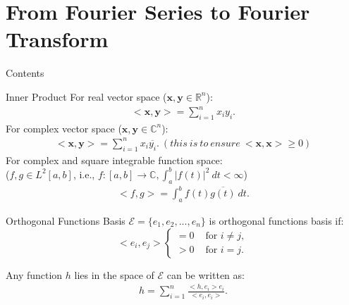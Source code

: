 \documentclass{beamer}
\begin{document}
	\section[Fourier Analysis]{From Fourier Series to Fourier Transform}
		\begin{frame}{Contents}
			\small
		\end{frame}
	\begin{frame}{Inner Product}
		For real vector space ($\boldsymbol{x}, \boldsymbol{y} \in \mathbb{R}^n$):
		\begin{align*}
			<\boldsymbol{x}, \boldsymbol{y}> = \sum_{i=1}^{n}x_iy_i.
		\end{align*}
		For complex vector space ($\boldsymbol{x}, \boldsymbol{y} \in \mathbb{C}^n$):
		\begin{align*}
			<\boldsymbol{x}, \boldsymbol{y}> = \sum_{i=1}^{n}x_i\overline{y_i}.\ (this\ is\ to\ ensure\ <\boldsymbol{x}, \boldsymbol{x}>\geq 0)
		\end{align*}
		For complex and square integrable function space: \\($f,g \in L^2[a,b]$, i.e., $f: [a,b] \rightarrow \mathbb{C}, \int_{a}^{b} | f(t) |^2 \ dt < \infty$)
		\begin{align*}
			<f,g> = \int_{a}^{b} f(t) \overline{g(t)}\ dt.
		\end{align*}
	\end{frame}
	\begin{frame}{Orthogonal Functions Basis}
		$\mathcal{E}=\{e_1, e_2, ..., e_n\}$ is orthogonal functions basis if:
		\begin{equation*}
			<e_i, e_j>
			\begin{cases}
			=0 & \text{ for } i \neq j,\\
			>0 & \text{ for }  i = j.
			\end{cases}
		\end{equation*}

		
		Any function $h$ lies in the space of $\mathcal{E}$ can be written as:
		\begin{align*}
			h = \sum_{i=1}^{n} \frac{<h, e_i>e_i}{<e_i, e_i>}.
		\end{align*}
	\end{frame}
\end{document}
